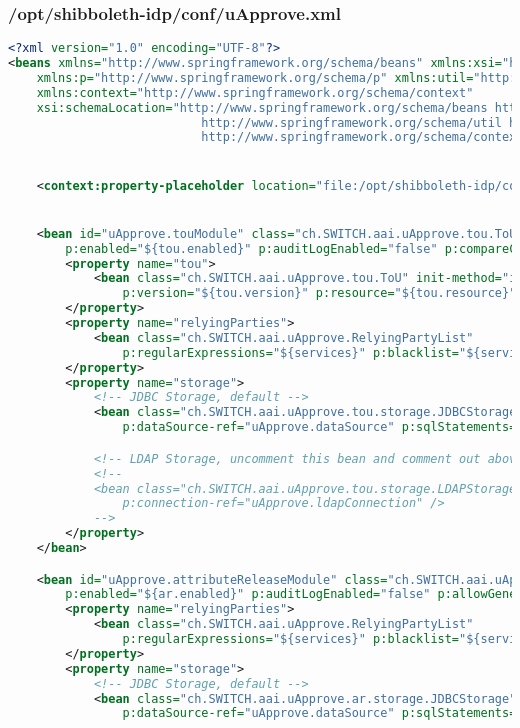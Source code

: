 \subsubsection{/opt/shibboleth-idp/conf/uApprove.xml}
\begin{lstlisting}[language=xml]
<?xml version="1.0" encoding="UTF-8"?>
<beans xmlns="http://www.springframework.org/schema/beans" xmlns:xsi="http://www.w3.org/2001/XMLSchema-instance"
    xmlns:p="http://www.springframework.org/schema/p" xmlns:util="http://www.springframework.org/schema/util"
    xmlns:context="http://www.springframework.org/schema/context"
    xsi:schemaLocation="http://www.springframework.org/schema/beans http://www.springframework.org/schema/beans/spring-beans-2.5.xsd
                           http://www.springframework.org/schema/util http://www.springframework.org/schema/util/spring-util-2.5.xsd
                           http://www.springframework.org/schema/context http://www.springframework.org/schema/context/spring-context-2.5.xsd">


    <context:property-placeholder location="file:/opt/shibboleth-idp/conf/uApprove.properties" />


    <bean id="uApprove.touModule" class="ch.SWITCH.aai.uApprove.tou.ToUModule" init-method="initialize"
        p:enabled="${tou.enabled}" p:auditLogEnabled="false" p:compareContent="false">
        <property name="tou">
            <bean class="ch.SWITCH.aai.uApprove.tou.ToU" init-method="initialize"
                p:version="${tou.version}" p:resource="${tou.resource}" />
        </property>
        <property name="relyingParties">
            <bean class="ch.SWITCH.aai.uApprove.RelyingPartyList"
                p:regularExpressions="${services}" p:blacklist="${services.blacklist}" />
        </property>
        <property name="storage">
            <!-- JDBC Storage, default -->
            <bean class="ch.SWITCH.aai.uApprove.tou.storage.JDBCStorage" init-method="initialize"
                p:dataSource-ref="uApprove.dataSource" p:sqlStatements="classpath:/storage/sql-statements.properties" p:graceful="false" />

            <!-- LDAP Storage, uncomment this bean and comment out above JDBC bean to activate LDAP -->
            <!--
            <bean class="ch.SWITCH.aai.uApprove.tou.storage.LDAPStorage"
                p:connection-ref="uApprove.ldapConnection" />
            -->
        </property>
    </bean>

    <bean id="uApprove.attributeReleaseModule" class="ch.SWITCH.aai.uApprove.ar.AttributeReleaseModule" init-method="initialize"
        p:enabled="${ar.enabled}" p:auditLogEnabled="false" p:allowGeneralConsent="${ar.allowGeneralConsent}" p:compareAttributeValues="false">
        <property name="relyingParties">
            <bean class="ch.SWITCH.aai.uApprove.RelyingPartyList"
                p:regularExpressions="${services}" p:blacklist="${services.blacklist}" />
        </property>
        <property name="storage">
            <!-- JDBC Storage, default -->
            <bean class="ch.SWITCH.aai.uApprove.ar.storage.JDBCStorage" init-method="initialize"
                p:dataSource-ref="uApprove.dataSource" p:sqlStatements="classpath:/storage/sql-statements.properties" p:graceful="false" />


\end{lstlisting}
